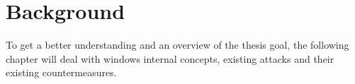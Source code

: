 \section{Background}
\label{sec:background}
To get a better understanding and an overview of the thesis goal, the following chapter will deal with windows internal concepts, existing attacks and their existing countermeasures.


